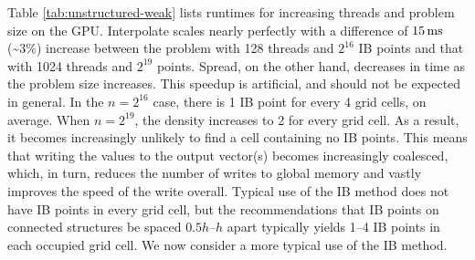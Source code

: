 Table \ref{tab:unstructured-weak} lists runtimes for increasing threads and
problem size on the GPU. Interpolate scales nearly perfectly with a difference
of $15\ms$ (\textasciitilde3\%) increase between the problem with 128 threads
and $2^{16}$ IB points and that with 1024 threads and $2^{19}$ points. Spread,
on the other hand, decreases in time as the problem size increases. This
speedup is artificial, and should not be expected in general. In the $n=2^{16}$
case, there is 1 IB point for every 4 grid cells, on average. When $n=2^{19}$,
the density increases to 2 for every grid cell. As a result, it becomes
increasingly unlikely to find a cell containing no IB points. This means that
writing the values to the output vector(s) becomes increasingly coalesced,
which, in turn, reduces the number of writes to global memory and vastly
improves the speed of the write overall. Typical use of the IB method does not
have IB points in every grid cell, but the recommendations that IB points on
connected structures be spaced $0.5h$--$h$ apart typically yields 1--4 IB
points in each occupied grid cell. We now consider a more typical use of the IB
method.

